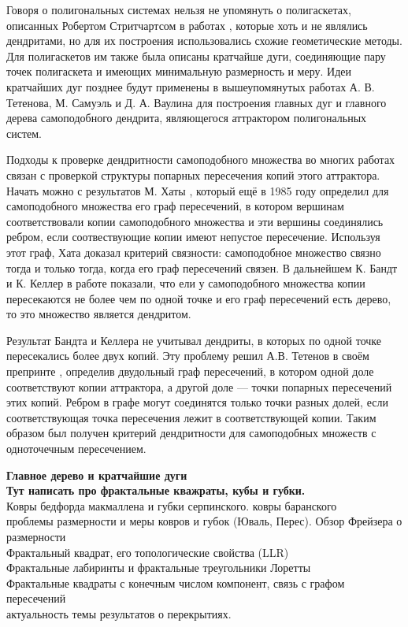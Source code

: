 Говоря о полигональных системах нельзя не упомянуть о полигаскетах, описанных Робертом Стритчартсом в работах \cite{strich1999, Strichartz1999}, которые хоть и не являлись дендритами, но для их построения использовались схожие геометические методы.
Для полигаскетов им также была описаны кратчайше дуги, соединяющие пару точек полигаскета и имеющих минимальную размерность и меру.
Идеи кратчайших дуг позднее будут применены в вышеупомянутых работах \cite{TSV2017, STV2017} А. В. Тетенова, М. Самуэль и Д. А. Ваулина для построения главных дуг и главного дерева самоподобного дендрита, являющегося аттрактором полигональных систем.

Подходы к проверке дендритности самоподобного множества во многих работах связан с проверкой структуры попарных пересечения копий этого аттрактора.
Начать можно с результатов М. Хаты \cite{Hata1985}, который ещё в 1985 году определил для самоподобного множества его граф пересечений, в котором вершинам соответствовали копии самоподобного множества и эти вершины соединялись ребром, если соотвествующие копии имеют непустое пересечение.
Используя этот граф, Хата доказал критерий связности: самоподобное множество связно тогда и только тогда, когда его граф пересечений связен.
В дальнейшем К. Бандт и К. Келлер в работе \cite{SSS2} показали, что ели у самоподобного множества копии пересекаются не более чем по одной точке и его граф пересечений есть дерево, то это множество является дендритом.

Результат Бандта и Келлера не учитывал дендриты, в которых по одной точке пересекались более двух копий. 
Эту проблему решил А.В. Тетенов в своём препринте \cite{FIP}, определив двудольный граф пересечений, в котором одной доле соответствуют копии аттрактора, а другой доле --- точки попарных пересечений этих копий. Ребром в графе могут соединятся только точки разных долей, если соответствующая точка пересечения лежит в соответствующей копии.
Таким образом был получен критерий дендритности для самоподобных множеств с одноточечным пересечением.

{\bf Главное дерево и кратчайшие дуги}\\


{\bf Тут написать про фрактальные кважраты, кубы и губки.}\\
Ковры бедфорда макмаллена и губки серпинского. ковры баранского\\
проблемы размерности и меры ковров и губок (Юваль, Перес). Обзор Фрейзера о размерности\\
Фрактальный квадрат, его топологические свойства (LLR)\\
Фрактальные лабиринты и фрактальные треугольники Лоретты\\
Фрактальные квадраты с конечным числом компонент, связь с графом пересечений\\
актуальность темы результатов о перекрытиях.\\

